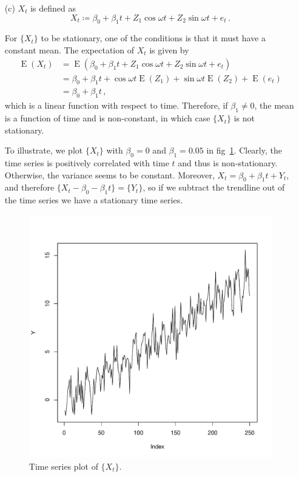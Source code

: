 \documentclass[10pt]{fphw}
\theoremstyle{definition}
\newcommand{\expect}{\operatorname{E}}
\begin{document}
\begin{enumerate}
\item[(c)] $X_t$ is defined as
\begin{equation}
    X_t \coloneqq \beta_0 + \beta_1 t + Z_1 \cos \omega t + Z_2 \sin \omega t + e_t\,.
\end{equation}

For $\{X_t\}$ to be stationary, one of the conditions is that it must have a constant mean.
The expectation of $X_t$ is given by
\begin{align}
    \expect(X_t)
        &= \expect(\beta_0 + \beta_1 t + Z_1 \cos \omega t + Z_2 \sin \omega t + e_t)\\
        &= \beta_0 + \beta_1 t + \cos \omega t \expect(Z_1) + \sin \omega t \expect(Z_2) + \expect(e_t)\\
        &= \beta_0 + \beta_1 t\,,
\end{align}
which is a linear function with respect to time.
Therefore, if $\beta_1 \neq 0$, the mean is a function of time and is non-constant, in which case $\{X_t\}$ is not stationary.

To illustrate, we plot $\{X_t\}$ with $\beta_0 = 0$ and $\beta_1 = 0.05$ in fig~\ref{fig:plot2c}.
Clearly, the time series is positively correlated with time $t$ and thus is non-stationary.
Otherwise, the variance seems to be constant.
Moreover, $X_t = \beta_0 + \beta_1 t + Y_t$, and therefore $\{X_t - \beta_0 - \beta_1 t\} = \{Y_t\}$,
so if we subtract the trendline out of the time series we have a stationary time series.

\begin{figure}
    \centering
    \includegraphics[width=.5\linewidth]{plot2_c}
    \caption{Time series plot of $\{X_t\}$.}
    \label{fig:plot2c}
\end{figure}


\end{enumerate}
\end{document}
